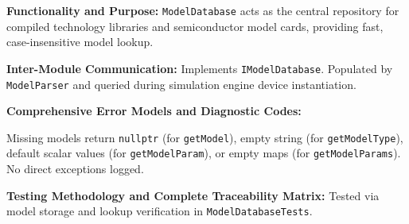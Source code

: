 \textbf{Functionality and Purpose:} \texttt{ModelDatabase} acts as the central repository for compiled technology libraries and semiconductor model cards, providing fast, case-insensitive model lookup.

\textbf{Inter-Module Communication:} Implements \texttt{IModelDatabase}. Populated by \texttt{ModelParser} and queried during simulation engine device instantiation.

\textbf{Comprehensive Error Models and Diagnostic Codes:}
\begin{compactitem}
    \item Missing models return \texttt{nullptr} (for \texttt{getModel}), empty string (for \texttt{getModelType}), default scalar values (for \texttt{getModelParam}), or empty maps (for \texttt{getModelParams}). No direct exceptions logged.
\end{compactitem}

\textbf{Testing Methodology and Complete Traceability Matrix:} Tested via model storage and lookup verification in \texttt{ModelDatabaseTests}.


